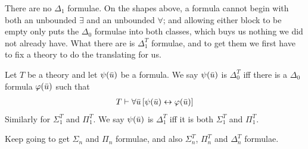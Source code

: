 There are no $\Delta_1$ formulae. On the shapes above, a formula cannot begin with both an unbounded $\exists$ and an unbounded $\forall$; and allowing either block to be empty only puts the $\Delta_0$ formulae into both classes, which buys us nothing we did not already have. What there are is $\Delta_1^T$ formulae, and to get them we first have to fix a theory to do the translating for us.

\begin{boxdefinition}
    Let $T$ be a theory and let $\psi\!\left( \bar{u} \right)$ be a formula. We say $\psi\!\left( \bar{u} \right)$ is $\Delta_0^T$ iff there is a $\Delta_0$ formula $\varphi\!\left( \bar{u} \right)$ such that
    \begin{align*}
        T \vdash \forall \bar{u} \left[ \psi\!\left( \bar{u} \right) \leftrightarrow \varphi\!\left( \bar{u} \right) \right]
    \end{align*}
    Similarly for $\Sigma_1^T$ and $\Pi_1^T$. We say $\psi\!\left( \bar{u} \right)$ is $\Delta_1^T$ iff it is both $\Sigma_1^T$ and $\Pi_1^T$.
\end{boxdefinition}

Keep going to get $\Sigma_n$ and $\Pi_n$ formulae, and also $\Sigma_n^T$, $\Pi_n^T$ and $\Delta_n^T$ formulae.
